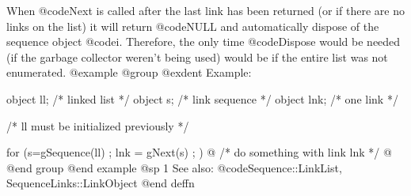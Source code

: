 When @code{Next} is called after the last link has been returned (or
if there are no links on the list) it will return @code{NULL} and
automatically dispose of the sequence object @code{i}.  Therefore,
the only time @code{Dispose} would be needed (if the garbage collector
weren't being used) would be if the entire list was not enumerated.
@example
@group
@exdent Example:

object  ll;  /*  linked list    */
object  s;   /*  link sequence  */
object  lnk; /*  one link       */

/*  ll must be initialized previously  */

for (s=gSequence(ll) ; lnk = gNext(s) ; )  @{
        /*  do something with link lnk  */
@}
@end group
@end example
@sp 1
See also:  @code{Sequence::LinkList, SequenceLinks::LinkObject}
@end deffn











